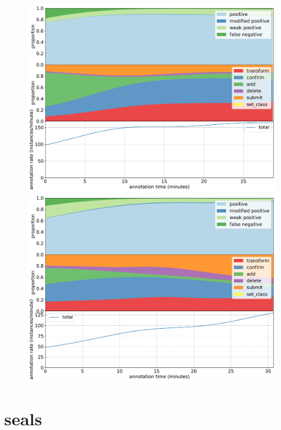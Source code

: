 \pagebreak
\begin{figure}[H]
\begin{minipage}[c][\textheight]{\textwidth}
\centering
\includegraphics[width=1.0\linewidth]{charts/aerial_penguins/action_annotations/hallett_a.pdf}
\includegraphics[width=1.0\linewidth]{charts/aerial_penguins/action_annotations/royds_a.pdf}
\caption{  }
\label{fig:royds_annotation}
\end{minipage}
\end{figure}


\pagebreak
\section {seals}
\label{sec:seals_details}


